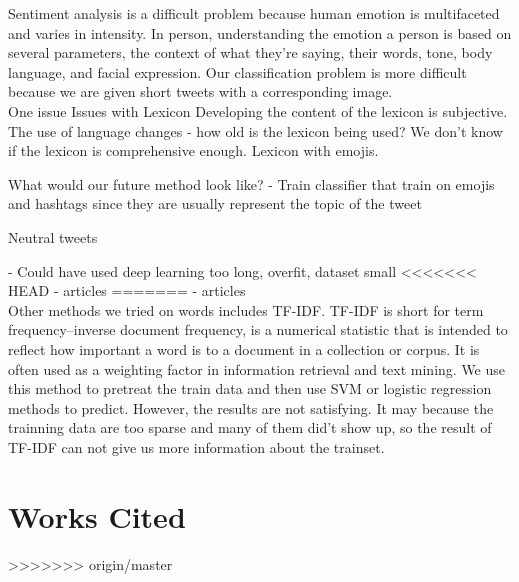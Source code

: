 \documentclass[]{article}
\begin{document}
Sentiment analysis is a difficult problem because human emotion is multifaceted and varies in intensity. In person, understanding the emotion a person is based on several parameters, the context of what they're saying, their words, tone, body language, and facial expression. Our classification problem is more difficult because we are given short tweets with a corresponding image. \\

One issue 
Issues with Lexicon
Developing the content of the lexicon is subjective. The use of language changes - how old is the lexicon being used? We don't know if the lexicon is comprehensive enough. Lexicon with emojis. 

What would our future method look like?
- Train classifier that train on emojis and hashtags since they are usually represent the topic of the tweet


Neutral tweets 


- Could have used deep learning 
	too long, overfit, dataset small
<<<<<<< HEAD
- articles 
=======
- articles \\
Other methods we tried on words includes TF-IDF. TF-IDF is short for term frequency–inverse document frequency, is a numerical statistic that is intended to reflect how important a word is to a document in a collection or corpus. It is often used as a weighting factor in information retrieval and text mining. We use this method to pretreat the train data and then use SVM or logistic regression methods to predict. However, the results are not satisfying. It may because the trainning data are too sparse and many of them did't show up, so the result of TF-IDF can not give us more information about the trainset.

\section{Works Cited}
\begin{thebibliography}{1}


\end{thebibliography}
>>>>>>> origin/master
\end{document}

